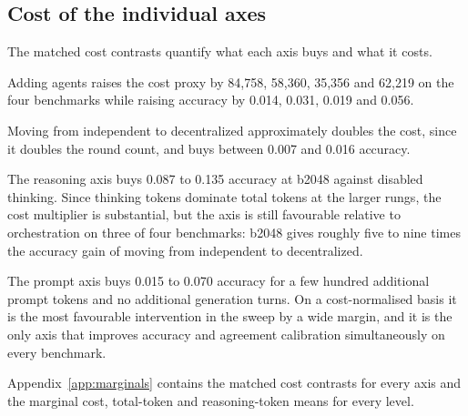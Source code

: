 \subsection{Cost of the individual axes}

The matched cost contrasts quantify what each axis buys and what it costs.

Adding agents raises the cost proxy by 84{,}758, 58{,}360, 35{,}356 and 62{,}219 on the four
benchmarks while raising accuracy by 0.014, 0.031, 0.019 and 0.056.

Moving from independent to decentralized approximately doubles the cost, since it doubles
the round count, and buys between 0.007 and 0.016 accuracy.

The reasoning axis buys 0.087 to 0.135 accuracy at b2048 against disabled thinking. Since
thinking tokens dominate total tokens at the larger rungs, the cost multiplier is
substantial, but the axis is still favourable relative to orchestration on three of four
benchmarks: b2048 gives roughly five to nine times the accuracy gain of moving from
independent to decentralized.

The prompt axis buys 0.015 to 0.070 accuracy for a few hundred additional prompt tokens and
no additional generation turns. On a cost-normalised basis it is the most favourable
intervention in the sweep by a wide margin, and it is the only axis that improves accuracy
and agreement calibration simultaneously on every benchmark.

Appendix~\ref{app:marginals} contains the matched cost contrasts for every axis and the
marginal cost, total-token and reasoning-token means for every level.
